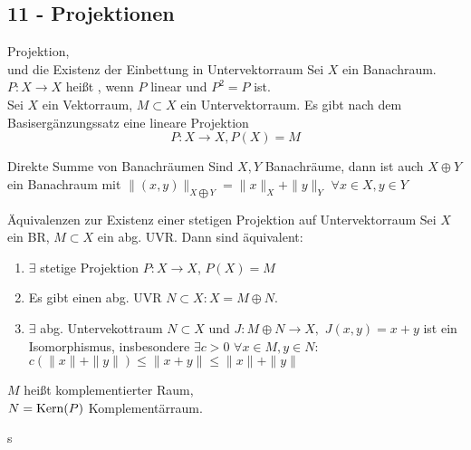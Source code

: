 \subsection*{11 - Projektionen}

	\begin{karte}{Projektion, \\ und die Existenz der Einbettung in Untervektorraum}
	Sei $X$ ein Banachraum. $P \colon X \rightarrow X$ hei{\ss}t , wenn $P$ linear und $P^{2} = P$ ist. \\


	Sei $X$ ein Vektorraum, $M \subset X$ ein Untervektorraum. Es gibt nach dem Basisergänzungssatz eine lineare Projektion 
		\[ P \colon X \rightarrow X, P(X) = M \]	
	\end{karte}

	\begin{karte}{Direkte Summe von Banachräumen}
	Sind $X, Y$ Banachräume, dann ist auch $X \oplus Y$ ein Banachraum mit $\| (x, y) \|_{X \bigoplus Y} = \| x \|_{X} + \| y \|_{Y}$ $\forall x \in X, y \in Y$
	\end{karte}

	\begin{karte}{Äquivalenzen zur Existenz einer stetigen Projektion auf Untervektorraum}
	Sei $X$ ein BR, $M \subset X$ ein abg. UVR. Dann sind äquivalent:
	\begin{enumerate}[label=\alph*\upshape)]
		\item $\exists$ stetige Projektion $P \colon X \rightarrow X$, $P(X) = M$
		\item Es gibt einen abg. UVR $N \subset X: X = M \oplus N$.
		\item $\exists$ abg. Untervekottraum $N \subset X$ und $J: M \oplus N \rightarrow X,$ $J(x, y) = x + y$ ist ein Isomorphismus, insbesondere $\exists c > 0$ $\forall x \in M, y \in N:$ $c \left( \|x \| + \|y \| \right) \leq \|x + y \| \leq \|x \| + \| y \| $
	\end{enumerate}
	$M$ hei{\ss}t komplementierter Raum, \\
	$N = \mathop{\rm Kern}\nolimits(P)$ Komplementärraum.
	\end{karte}s